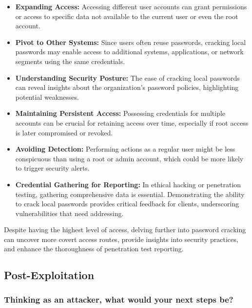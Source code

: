 \begin{itemize}
    \item \textbf{Expanding Access:}
          Accessing different user accounts can grant permissions or access to specific data not available to the current user or even the root account.

    \item \textbf{Pivot to Other Systems:}
          Since users often reuse passwords, cracking local passwords may enable access to additional systems, applications, or network segments using the same credentials.

    \item \textbf{Understanding Security Posture:}
          The ease of cracking local passwords can reveal insights about the organization's password policies, highlighting potential weaknesses.

    \item \textbf{Maintaining Persistent Access:}
          Possessing credentials for multiple accounts can be crucial for retaining access over time, especially if root access is later compromised or revoked.

    \item \textbf{Avoiding Detection:}
          Performing actions as a regular user might be less conspicuous than using a root or admin account, which could be more likely to trigger security alerts.

    \item \textbf{Credential Gathering for Reporting:}
          In ethical hacking or penetration testing, gathering comprehensive data is essential. Demonstrating the ability to crack local passwords provides critical feedback for clients, underscoring vulnerabilities that need addressing.
\end{itemize}

Despite having the highest level of access, delving further into password cracking can uncover more covert access routes, provide insights into security practices, and enhance the thoroughness of penetration test reporting.




\subsection{Post-Exploitation}

\subsubsection{Thinking as an attacker, what would your next steps be?}

